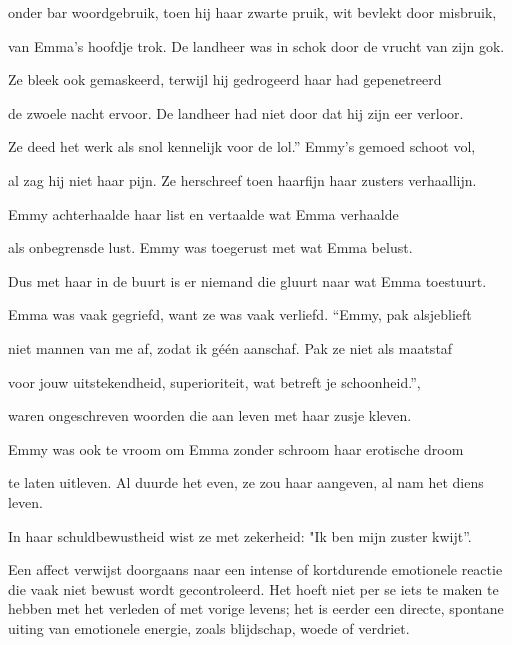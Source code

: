 onder bar woordgebruik,
toen hij haar zwarte pruik,
wit bevlekt door misbruik,

van Emma’s hoofdje trok.
De landheer was in schok
door de vrucht van zijn gok.

Ze bleek ook gemaskeerd,
terwijl hij gedrogeerd
haar had gepenetreerd

de zwoele nacht ervoor.
De landheer had niet door
dat hij zijn eer verloor.

Ze deed het werk als snol
kennelijk voor de lol.”
Emmy’s gemoed schoot vol,

al zag hij niet haar pijn.
Ze herschreef toen haarfijn
haar zusters verhaallijn.

Emmy achterhaalde
haar list en vertaalde
wat Emma verhaalde

als onbegrensde lust.
Emmy was toegerust
met wat Emma belust.

Dus met haar in de buurt
is er niemand die gluurt
naar wat Emma toestuurt.

Emma was vaak gegriefd,
want ze was vaak verliefd.
“Emmy, pak alsjeblieft

niet mannen van me af,
zodat ik géén aanschaf.
Pak ze niet als maatstaf

voor jouw uitstekendheid,
superioriteit,
wat betreft je schoonheid.”,

waren ongeschreven
woorden die aan leven
met haar zusje kleven.

Emmy was ook te vroom
om Emma zonder schroom
haar erotische droom

te laten uitleven.
Al duurde het even,
ze zou haar aangeven,
al nam het diens leven.

In haar schuldbewustheid
wist ze met zekerheid:
"Ik ben mijn zuster kwijt”.

Een affect verwijst doorgaans naar een intense of kortdurende emotionele reactie die vaak niet bewust wordt gecontroleerd. Het hoeft niet per se iets te maken te hebben met het verleden of met vorige levens; het is eerder een directe, spontane uiting van emotionele energie, zoals blijdschap, woede of verdriet.


